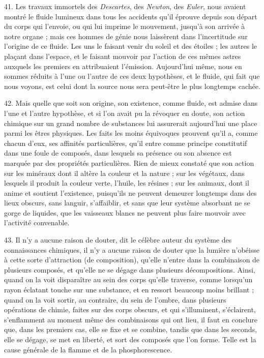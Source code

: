 \documentclass[a4paper, 11pt, oneside, polutonikogreek, french]{article}
\begin{document}
41. Les travaux immortels des \emph{Descartes}, des \emph{Newton}, des \emph{Euler}, nous avaient montré le fluide lumineux dans tous les accidents qu'il éprouve depuis son départ du corps qui l'envoie, ou qui lui imprime le mouvement, jusqu'à son arrivée à notre organe ; mais ces hommes de génie nous laissèrent dans l'incertitude sur l'origine de ce fluide. Les uns le faisant venir du soleil et des étoiles ; les autres le plaçant dans l'espace, et le faisant mouvoir par l'action de ces mêmes astres auxquels les premiers en attribuaient l'émission. Aujourd'hui même, nous en sommes réduits à l'une ou l'autre de ces deux hypothèses, et le fluide, qui fait que nous voyons, est celui dont la source nous sera peut-être le plus longtemps cachée.

42. Mais quelle que soit son origine, son existence, comme fluide, est admise dans l'une et l'autre hypothèse, et si l'on avait pu la révoquer en doute, son action chimique sur un grand nombre de substances lui assurerait aujourd'hui une place parmi les êtres physiques. Les faits les moins équivoques prouvent qu'il a, comme chacun d'eux, ses affinités particulières, qu'il entre comme principe constitutif dans une foule de composés, dans lesquels sa présence ou son absence est marquée par des propriétés particulières. Rien de mieux constaté que son action sur les minéraux dont il altère la couleur et la nature ; sur les végétaux, dans lesquels il produit la couleur verte, l'huile, les résines ; sur les animaux, dont il anime et soutient l'existence, puisqu'ils ne peuvent demeurer longtemps dans des lieux obscurs, sans languir, s'affaiblir, et sans que leur système absorbant ne se gorge de liquides, que les vaisseaux blancs ne peuvent plus faire mouvoir avec l'activité convenable.

43. \og Il n'y a aucune raison de douter, dit le célèbre auteur du système des connaissances chimiques, il n'y a aucune raison de douter que la lumière n'obéisse à cette sorte d'attraction (de composition), qu'elle n'entre dans la combinaison de plusieurs composés, et qu'elle ne se dégage dans plusieurs décompositions. Ainsi, quand on la voit disparaître au sein des corps qu'elle traverse, comme lorsqu'un rayon éclatant touche sur une substance, et en ressort beaucoup moins brillant ; quand on la voit sortir, au contraire, du sein de l'ombre, dans plusieurs opérations de chimie, faites sur des corps obscurs, et qui s'illuminent, s'éclairent, s'enflamment au moment même des combinaisons qui ont lieu, il faut en conclure que, dans les premiers cas, elle se fixe et se combine, tandis que dans les seconds, elle se dégage, se met en liberté, et sort des composés que l'on forme. Telle est la cause générale de la flamme et de la phosphorescence. \fg
\end{document}
